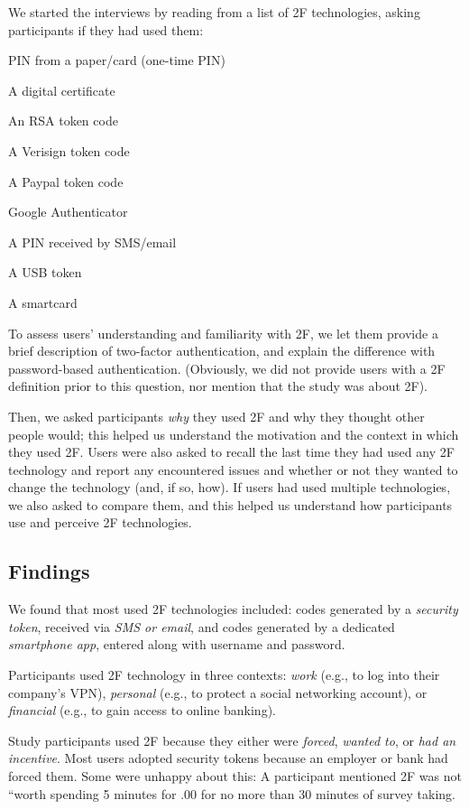 \documentclass[conference]{IEEEtran}
\begin{document}
We started the interviews by reading from a list of 2F technologies, asking participants if they had used them: 
\begin{compactitem}
\item PIN from a paper/card (one-time PIN)
\item A digital certificate
\item An RSA token code
\item A Verisign token code
\item A Paypal token code
\item Google Authenticator
\item A PIN received by SMS/email
\item A USB token
\item A smartcard
\end{compactitem}

To assess users' understanding and familiarity with 2F, we let them provide a brief 
description of two-factor authentication, and explain the difference with password-based authentication. (Obviously, we did not provide users with a 2F definition prior to this question, nor mention that the study was about 2F).

Then, we asked participants {\em why} they used 2F and why they thought other people would; this helped us understand the motivation and the context in which they used 2F.
Users were also asked to recall the last time they had used any 2F technology and report any encountered issues and whether or not they wanted to change the technology (and, if so, how). If users had used multiple technologies, we also asked to compare them, and this helped us understand how participants use and perceive 2F technologies.


\subsection{Findings}
We found that most used 2F technologies included: codes generated by a \emph{security token}, received via \emph{SMS or email}, and codes generated by a dedicated \emph{smartphone app}, entered along with username and password.


Participants used 2F technology in three contexts: \emph{work} (e.g., to log into their company's VPN), \emph{personal} (e.g., to protect a social networking account), or \emph{financial} (e.g., to gain access to online banking).

Study participants used 2F because they either were \emph{forced}, \emph{wanted to}, or \emph{had an incentive}. Most users adopted security tokens because an employer or bank had forced them. Some were unhappy about this: A participant mentioned 2F was not ``worth spending 5 minutes for \2.00 for no more than 30 minutes of survey taking. 
\end{document}
